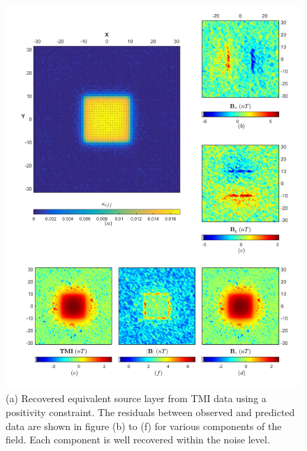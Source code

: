 \begin{figure}[h!]
\centering
\includegraphics[scale=0.55]{ES_Li_Full_Space}
\caption{(a) Recovered equivalent source layer from TMI data using a positivity constraint. The residuals between observed and predicted data are shown in figure (b) to (f) for various components of the field. Each component is well recovered within the noise level.}
\label{fig:ES_Li_Full_Space}
\end{figure}

\newpage
